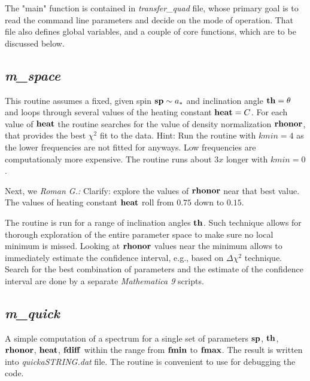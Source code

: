 \documentclass{emulateapj}
\newcommand{\mat}{\textit{Mathematica 9 }}
\newcommand{\rg}[1]{\color{blue}\textit{Roman G.:} #1\color{black}}
\begin{document}
The "main" function is contained in \textit{transfer\_quad} file,
whose primary goal is to read the command line parameters and decide
on the mode of operation. That file also defines global variables, and
a couple of core functions, which are to be discussed below.

\subsection{\textit{m\_space}}
This routine assumes a fixed, given spin ${\bf sp}\sim a_*$ and
inclination angle ${\bf th}=\theta$ and loops through several values
of the heating constant ${\bf heat}=C$. For each value of ${\bf heat}$
the routine searches for the value of density normalization ${\bf
  rhonor}$, that provides the best $\chi^2$ fit to the data. Hint: Run
the routine with $kmin=4$ as the lower frequencies are not fitted for
anyways. Low frequencies are computationaly more expensive. The
routine runs about $3x$ longer with $kmin=0$.

Next, we \rg{Clarify: explore} the values of ${\bf rhonor}$ near that
best value.  The values of heating constant ${\bf heat}$ roll from
$0.75$ down to $0.15$.

The routine is run for a range of inclination angles ${\bf th}$.  Such
technique allows for thorough exploration of the entire parameter
space to make sure no local minimum is missed.  Looking at ${\bf
  rhonor}$ values near the minimum allows to immediately estimate the
confidence interval, e.g., based on $\Delta\chi^2$ technique.  Search
for the best combination of parameters and the estimate of the
confidence interval are done by a separate \mat scripts.

\subsection{\textit{m\_quick}}
A simple computation of a spectrum for a single set of parameters
${\bf sp}$, ${\bf th}$, ${\bf rhonor}$, ${\bf heat}$, ${\bf fdiff}$
within the range from ${\bf fmin}$ to ${\bf fmax}$. The result is
written into \textit{quickaSTRING.dat} file.  The routine is
convenient to use for debugging the code.
\end{document}
